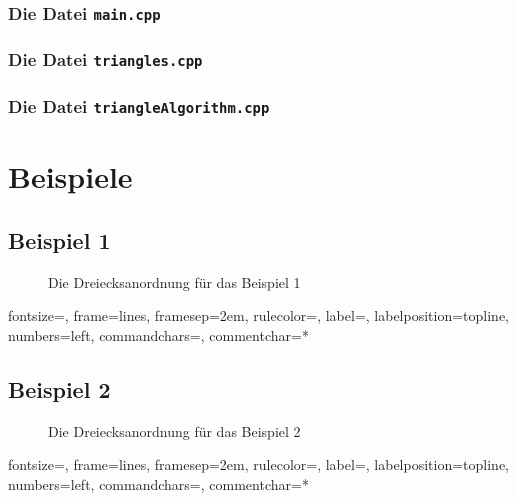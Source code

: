 \documentclass[a4paper, notitlepage, 12pt]{scrartcl}
\begin{document}
\subsubsection{Die Datei \texttt{main.cpp}}
\subsubsection{Die Datei \texttt{triangles.cpp}}
\subsubsection{Die Datei \texttt{triangleAlgorithm.cpp}}
\section{Beispiele}
\subsection{Beispiel 1}
\begin{figure}[H] 
	
	\caption{Die Dreiecksanordnung für das Beispiel 1}
\end{figure}
%
{fontsize=\footnotesize,
	frame=lines,  %
	framesep=2em, %
	rulecolor=\color{Gray},
	label=,
	labelposition=topline,
	numbers=left,
	commandchars=\|\(\), %
	commentchar=*        %
}
\subsection{Beispiel 2}
\begin{figure}[H] 
	
	\caption{Die Dreiecksanordnung für das Beispiel 2}
\end{figure}
%
{fontsize=\footnotesize,
	frame=lines,  %
	framesep=2em, %
	rulecolor=\color{Gray},
	label=,
	labelposition=topline,
	numbers=left,
	commandchars=\|\(\), %
	commentchar=*        %
}
\end{document}
